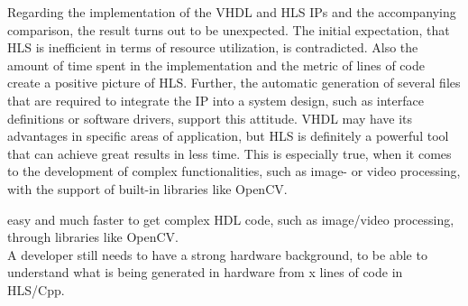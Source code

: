 Regarding the implementation of the VHDL and HLS IPs and the accompanying comparison, the result turns out to be unexpected.
The initial expectation, that HLS is inefficient in terms of resource utilization, is contradicted.
Also the amount of time spent in the implementation and the metric of lines of code create a positive picture of HLS.
Further, the automatic generation of several files that are required to integrate the IP into a system design, such as interface definitions or software drivers, support this attitude.
VHDL may have its advantages in specific areas of application, but HLS is definitely a powerful tool that can achieve great results in less time.
This is especially true, when it comes to the development of complex functionalities, such as image- or video processing, with the support of built-in libraries like OpenCV.





%
%
%
%


easy and much faster to get complex HDL code, such as image/video processing, through libraries like OpenCV.\\
A developer still needs to have a strong hardware background, to be able to understand what is being generated in hardware from x lines of code in HLS/Cpp.
